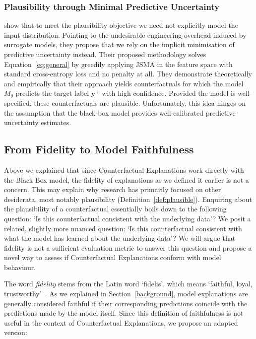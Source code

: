 \documentclass{article}
\begin{document}
\subsubsection{Plausibility through Minimal Predictive Uncertainty}

\citet{schut2021generating} show that to meet the plausibility objective we need not explicitly model the input distribution. Pointing to the undesirable engineering overhead induced by surrogate models, they propose that we rely on the implicit minimisation of predictive uncertainty instead. Their proposed methodology solves Equation~\ref{eq:general} by greedily applying JSMA in the feature space with standard cross-entropy loss and no penalty at all. They demonstrate theoretically and empirically that their approach yields counterfactuals for which the model $M_{\theta}$ predicts the target label $\mathbf{y}^+$ with high confidence. Provided the model is well-specified, these counterfactuals are plausible. Unfortunately, this idea hinges on the assumption that the black-box model provides well-calibrated predictive uncertainty estimates.

\subsection{From Fidelity to Model Faithfulness}

Above we explained that since Counterfactual Explanations work directly with the Black Box model, the fidelity of explanations as we defined it earlier is not a concern. This may explain why research has primarily focused on other desiderata, most notably plausibility (Definition~\ref{def:plausible}). Enquiring about the plausibility of a counterfactual essentially boils down to the following question: `Is this counterfactual consistent with the underlying data'? We posit a related, slightly more nuanced question: `Is this counterfactual consistent with what the model has learned about the underlying data'? We will argue that fidelity is not a sufficient evaluation metric to answer this question and propose a novel way to assess if Counterfactual Explanations conform with model behaviour. 

The word \textit{fidelity} stems from the Latin word `fidelis', which means `faithful, loyal, trustworthy'~\citep{mw2023fidelity}. As we explained in Section~\ref{background}, model explanations are generally considered faithful if their corresponding predictions coincide with the predictions made by the model itself. Since this definition of faithfulness is not useful in the context of Counterfactual Explanations, we propose an adapted version: 
\end{document}
